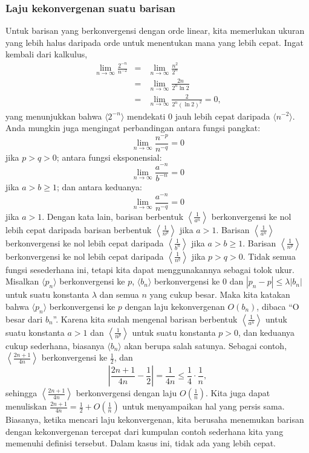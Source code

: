\subsubsection{Laju kekonvergenan suatu barisan}

Untuk barisan yang berkonvergensi dengan orde linear, kita memerlukan
ukuran yang lebih halus daripada orde untuk menentukan mana yang lebih
cepat. Ingat kembali dari kalkulus, 
\begin{eqnarray*}
\lim_{n\to\infty}\frac{2^{-n}}{n^{-2}} & = & \lim_{n\to\infty}\frac{n^{2}}{2^{n}}\\
 & = & \lim_{n\to\infty}\frac{2n}{2^{n}\ln2}\\
 & = & \lim_{n\to\infty}\frac{2}{2^{n}(\ln2)^{2}}=0,
\end{eqnarray*}
yang menunjukkan bahwa $\langle2^{-n}\rangle$ mendekati 0 jauh lebih
cepat daripada $\langle n^{-2}\rangle$. Anda mungkin juga mengingat
perbandingan antara fungsi pangkat:
\[
\lim_{n\to\infty}\frac{n^{-p}}{n^{-q}}=0
\]
jika $p>q>0$; antara fungsi eksponensial:
\[
\lim_{n\to\infty}\frac{a^{-n}}{b^{-n}}=0
\]
jika $a>b\geq1$; dan antara keduanya:
\[
\lim_{n\to\infty}\frac{a^{-n}}{n^{-q}}=0
\]
jika $a>1$. Dengan kata lain, barisan berbentuk $\left\langle \frac{1}{a^{n}}\right\rangle $
berkonvergensi ke nol lebih cepat daripada barisan berbentuk $\left\langle \frac{1}{n^{p}}\right\rangle $
jika $a>1$. Barisan $\left\langle \frac{1}{a^{n}}\right\rangle $
berkonvergensi ke nol lebih cepat daripada $\left\langle \frac{1}{b^{n}}\right\rangle $
jika $a>b\geq1$. Barisan $\left\langle \frac{1}{n^{p}}\right\rangle $
berkonvergensi ke nol lebih cepat daripada $\left\langle \frac{1}{n^{q}}\right\rangle $
jika $p>q>0$. Tidak semua fungsi sesederhana ini, tetapi kita dapat
menggunakannya sebagai tolok ukur. Misalkan $\langle p_{n}\rangle$
berkonvergensi ke $p$, $\langle b_{n}\rangle$ berkonvergensi ke
0 dan $|p_{n}-p|\leq\lambda|b_{n}|$ untuk suatu konstanta $\lambda$
dan semua $n$ yang cukup besar. Maka kita katakan bahwa $\langle p_{n}\rangle$
berkonvergensi ke $p$ dengan laju kekonvergenan 
$O(b_{n})$, dibaca ``O besar dari $b_{n}$''. Karena
kita sudah mengenal barisan berbentuk $\left\langle \frac{1}{a^{n}}\right\rangle $
untuk suatu konstanta $a>1$ dan $\left\langle \frac{1}{n^{p}}\right\rangle $
untuk suatu konstanta $p>0$, dan keduanya cukup sederhana, biasanya
$\langle b_{n}\rangle$ akan berupa salah satunya. Sebagai contoh,
$\left\langle \frac{2n+1}{4n}\right\rangle $ berkonvergensi ke $\frac{1}{2}$,
dan
\[
\left|\frac{2n+1}{4n}-\frac{1}{2}\right|=\frac{1}{4n}\leq\frac{1}{4}\cdot\frac{1}{n},
\]
sehingga $\left\langle \frac{2n+1}{4n}\right\rangle $ berkonvergensi
dengan laju $O(\frac{1}{n})$. Kita juga dapat menuliskan $\frac{2n+1}{4n}=\frac{1}{2}+O(\frac{1}{n})$
untuk menyampaikan hal yang persis sama. Biasanya, ketika mencari
laju kekonvergenan, kita berusaha menemukan barisan dengan kekonvergenan
tercepat dari kumpulan contoh sederhana kita yang memenuhi definisi
tersebut. Dalam kasus ini, tidak ada yang lebih cepat.


